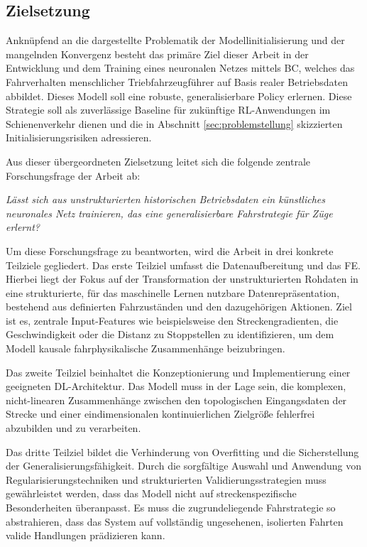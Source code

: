 \subsection{Zielsetzung}
\label{subsec:zielsetzung}

Anknüpfend an die dargestellte Problematik der Modellinitialisierung und der mangelnden Konvergenz besteht das primäre Ziel dieser Arbeit in der Entwicklung und dem Training eines neuronalen Netzes mittels \gls{BC}, welches das Fahrverhalten menschlicher Triebfahrzeugführer auf Basis realer Betriebsdaten abbildet. 
Dieses Modell soll eine robuste, generalisierbare Policy erlernen. 
Diese Strategie soll als zuverlässige Baseline für zukünftige \gls{RL}-Anwendungen im Schienenverkehr dienen und die in Abschnitt \ref{sec:problemstellung} skizzierten Initialisierungsrisiken adressieren.

Aus dieser übergeordneten Zielsetzung leitet sich die folgende zentrale Forschungsfrage der Arbeit ab:

\begin{center}
    \textit{Lässt sich aus unstrukturierten historischen Betriebsdaten ein künstliches neuronales Netz trainieren, das eine generalisierbare Fahrstrategie für Züge erlernt?}
\end{center}


Um diese Forschungsfrage zu beantworten, wird die Arbeit in drei konkrete Teilziele gegliedert. 
Das erste Teilziel umfasst die Datenaufbereitung und das \gls{FE}. 
Hierbei liegt der Fokus auf der Transformation der unstrukturierten Rohdaten in eine strukturierte, für das maschinelle Lernen nutzbare Datenrepräsentation, bestehend aus definierten Fahrzuständen und den dazugehörigen Aktionen. 
Ziel ist es, zentrale Input-Features wie beispielsweise den Streckengradienten, die Geschwindigkeit oder die Distanz zu Stoppstellen zu identifizieren, um dem Modell kausale fahrphysikalische Zusammenhänge beizubringen.

Das zweite Teilziel beinhaltet die Konzeptionierung und Implementierung einer geeigneten \gls{DL}-Architektur. 
Das Modell muss in der Lage sein, die komplexen, nicht-linearen Zusammenhänge zwischen den topologischen Eingangsdaten der Strecke und einer eindimensionalen kontinuierlichen Zielgröße fehlerfrei abzubilden und zu verarbeiten. 

Das dritte Teilziel bildet die Verhinderung von Overfitting und die Sicherstellung der Generalisierungsfähigkeit. 
Durch die sorgfältige Auswahl und Anwendung von Regularisierungstechniken und strukturierten Validierungsstrategien muss gewährleistet werden, dass das Modell nicht auf streckenspezifische Besonderheiten überanpasst. 
Es muss die zugrundeliegende Fahrstrategie so abstrahieren, dass das System auf vollständig ungesehenen, isolierten Fahrten valide Handlungen prädizieren kann.

